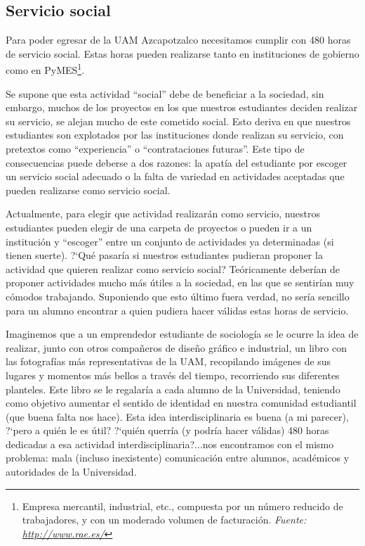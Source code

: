 \documentclass[12pt,letterpaper,titlepage]{article}
\begin{document}
\subsection{Servicio social}

Para poder egresar de la UAM Azcapotzalco necesitamos cumplir con 480 horas de servicio social. Estas horas pueden realizarse tanto en instituciones de gobierno como en PyMES\footnote{Empresa mercantil, industrial, etc., compuesta por un n\'umero reducido de trabajadores, y con un moderado volumen de facturaci\'on. \textit{Fuente: \href{http://www.rae.es/}{http://www.rae.es/}}}.

Se supone que esta actividad ``social'' debe de beneficiar a la sociedad, sin embargo, muchos de los proyectos en los que nuestros estudiantes deciden realizar su servicio, se alejan mucho de este cometido social. Esto deriva en que nuestros estudiantes son explotados por las instituciones donde realizan su servicio, con pretextos como ``experiencia'' o ``contrataciones futuras''. Este tipo de consecuencias puede deberse a dos razones: la apat\'ia del estudiante por escoger un servicio social adecuado o la falta de variedad en actividades aceptadas que pueden realizarse como servicio social.

Actualmente, para elegir que actividad realizar\'an como servicio, nuestros estudiantes pueden elegir de una carpeta de proyectos o pueden ir a un instituci\'on y ``escoger'' entre un conjunto de actividades ya determinadas  (si tienen suerte).  ?`Qu\'e pasar\'ia si nuestros estudiantes pudieran proponer la actividad que quieren realizar como servicio social? Te\'oricamente deber\'ian de proponer actividades mucho m\'as \'utiles a la sociedad, en las que se sentir\'ian muy c\'omodos trabajando. Suponiendo que esto \'ultimo fuera verdad, no ser\'ia sencillo para un alumno encontrar a quien pudiera hacer v\'alidas estas horas de servicio.


Imaginemos que a un emprendedor estudiante de sociolog\'ia se le ocurre la idea de realizar, junto con otros compa\~neros de dise\~no gr\'afico e industrial, un libro con las fotograf\'ias m\'as representativas de la UAM, recopilando im\'agenes de sus lugares y momentos m\'as bellos a trav\'es del tiempo, recorriendo sus diferentes planteles. Este libro se le regalar\'ia a cada alumno de la Universidad, teniendo como objetivo aumentar el sentido de identidad en nuestra comunidad estudiantil (que buena falta nos hace). Esta idea interdisciplinaria es buena (a mi parecer), ?`pero a qui\'en le es \'util? ?`qui\'en querr\'ia (y podr\'ia hacer v\'alidas) 480 horas dedicadas a esa actividad interdisciplinaria?...nos encontramos con el mismo problema: mala (incluso inexistente) comunicaci\'on entre alumnos, acad\'emicos y autoridades de la Universidad.
\end{document}
